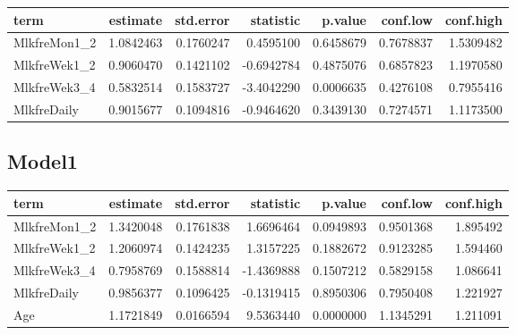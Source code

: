 \documentclass[
]{article}
\newenvironment{Shaded}{\begin{snugshade}}{\end{snugshade}}
\newcommand{\DataTypeTok}[1]{\textcolor[rgb]{0.13,0.29,0.53}{#1}}
\newcommand{\KeywordTok}[1]{\textcolor[rgb]{0.13,0.29,0.53}{\textbf{#1}}}
\newcommand{\NormalTok}[1]{#1}
\newcommand{\OperatorTok}[1]{\textcolor[rgb]{0.81,0.36,0.00}{\textbf{#1}}}
\newcommand{\OtherTok}[1]{\textcolor[rgb]{0.56,0.35,0.01}{#1}}
\newcommand{\StringTok}[1]{\textcolor[rgb]{0.31,0.60,0.02}{#1}}
\begin{document}
\begin{longtable}[]{@{}lrrrrrr@{}}
\toprule
term & estimate & std.error & statistic & p.value & conf.low &
conf.high\tabularnewline
\midrule
\endhead
MlkfreMon1\_2 & 1.0842463 & 0.1760247 & 0.4595100 & 0.6458679 &
0.7678837 & 1.5309482\tabularnewline
MlkfreWek1\_2 & 0.9060470 & 0.1421102 & -0.6942784 & 0.4875076 &
0.6857823 & 1.1970580\tabularnewline
MlkfreWek3\_4 & 0.5832514 & 0.1583727 & -3.4042290 & 0.0006635 &
0.4276108 & 0.7955416\tabularnewline
MlkfreDaily & 0.9015677 & 0.1094816 & -0.9464620 & 0.3439130 & 0.7274571
& 1.1173500\tabularnewline
\bottomrule
\end{longtable}

\hypertarget{model1-8}{%
\subsection{Model1}\label{model1-8}}

\begin{Shaded}
\end{Shaded}

\begin{longtable}[]{@{}lrrrrrr@{}}
\toprule
term & estimate & std.error & statistic & p.value & conf.low &
conf.high\tabularnewline
\midrule
\endhead
MlkfreMon1\_2 & 1.3420048 & 0.1761838 & 1.6696464 & 0.0949893 &
0.9501368 & 1.895492\tabularnewline
MlkfreWek1\_2 & 1.2060974 & 0.1424235 & 1.3157225 & 0.1882672 &
0.9123285 & 1.594460\tabularnewline
MlkfreWek3\_4 & 0.7958769 & 0.1588814 & -1.4369888 & 0.1507212 &
0.5829158 & 1.086641\tabularnewline
MlkfreDaily & 0.9856377 & 0.1096425 & -0.1319415 & 0.8950306 & 0.7950408
& 1.221927\tabularnewline
Age & 1.1721849 & 0.0166594 & 9.5363440 & 0.0000000 & 1.1345291 &
1.211091\tabularnewline
\bottomrule
\end{longtable}
\end{document}
